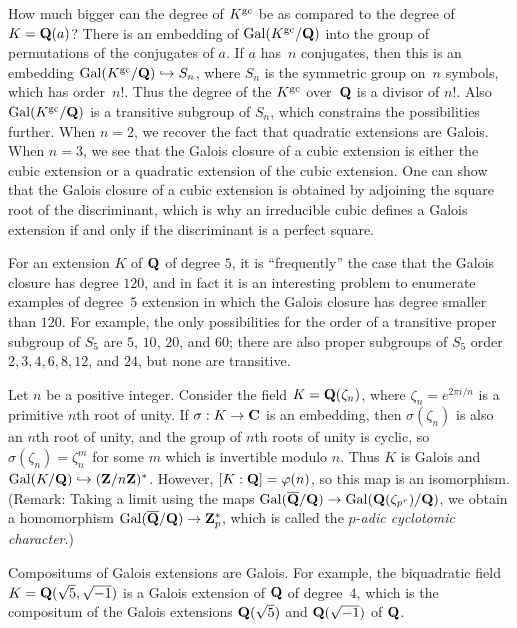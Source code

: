 How much bigger can the degree of $K^{\operatorname{gc}}$ be as compared to the
degree of $K=\mathbf{Q}(a)$? There is an embedding of
$\operatorname{Gal}(K^{\operatorname{gc}}/\mathbf{Q})$ into the group of permutations of the conjugates of
$a$.  If $a$ has~$n$ conjugates, then this is an embedding
$\operatorname{Gal}(K^{\operatorname{gc}}/\mathbf{Q})\hookrightarrow S_n$, where $S_n$ is the symmetric group on~$n$
symbols, which has order~$n!$.  Thus the degree of the $K^{\operatorname{gc}}$ over~$\mathbf{Q}$
is a divisor of $n!$. Also $\operatorname{Gal}(K^{\operatorname{gc}}/\mathbf{Q})$ is a transitive
subgroup of $S_n$, which constrains the possibilities further.  When
$n=2$, we recover the fact that quadratic extensions are Galois.  When
$n=3$, we see that the Galois closure of a cubic extension is either
the cubic extension or a quadratic extension of the cubic extension.
One can show that the Galois closure of a cubic extension is obtained
by adjoining the square root of the discriminant, which is why an
irreducible cubic defines a Galois extension if and only if the discriminant
is a perfect square.


For an extension
$K$ of $\mathbf{Q}$ of degree $5$, it is ``frequently'' the case that the Galois
closure has degree $120$, and in fact it is an
interesting problem to enumerate examples of degree~$5$ extension in which
the Galois closure has degree smaller than $120$.  
For example, the only possibilities for the order of a transitive proper subgroup
of $S_5$ are $5$, $10$, $20$, and $60$; there are also
proper subgroups of $S_5$ order $2, 3, 4, 6, 8, 12$, and $24$, but none
are transitive. 

Let $n$ be a positive integer.  Consider the field $K=\mathbf{Q}(\zeta_n)$,
where $\zeta_n=e^{2\pi i/n}$ is a primitive $n$th root of unity.  If
$\sigma:K\to \mathbf{C}$ is an embedding, then $\sigma(\zeta_n)$ is also an
$n$th root of unity, and the group of $n$th roots of unity is cyclic,
so $\sigma(\zeta_n) = \zeta_n^m$ for some $m$ which is invertible
modulo $n$.  Thus $K$ is Galois and $\operatorname{Gal}(K/\mathbf{Q})\hookrightarrow (\mathbf{Z}/n\mathbf{Z})^*$.
However, $[K:\mathbf{Q}]=\varphi(n)$, so this map is an isomorphism.  (Remark:
Taking a limit using the maps $\operatorname{Gal}(\overline{\mathbf{Q}}/\mathbf{Q})\to
\operatorname{Gal}(\mathbf{Q}(\zeta_{p^r})/\mathbf{Q})$, we obtain a homomorphism $\operatorname{Gal}(\overline{\mathbf{Q}}/\mathbf{Q})\to
\mathbf{Z}_p^*$, which is called the {\em $p$-adic cyclotomic character}.)

Compositums of Galois extensions are Galois.  For example, the
biquadratic field $K=\mathbf{Q}(\sqrt{5},\sqrt{-1})$ is a Galois
extension of $\mathbf{Q}$ of degree~$4$, which is the compositum
of the Galois extensions $\mathbf{Q}(\sqrt{5})$ and $\mathbf{Q}(\sqrt{-1})$ of $\mathbf{Q}$.

